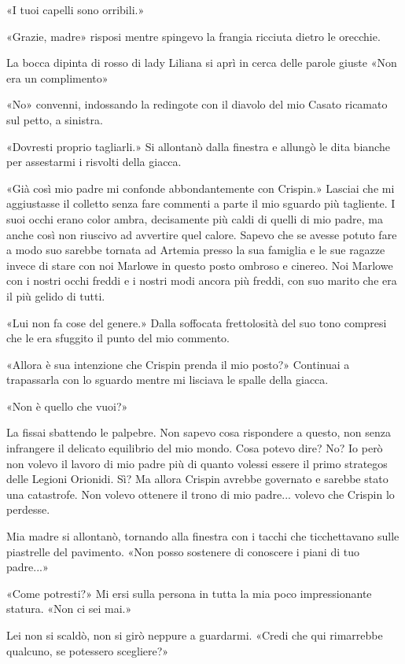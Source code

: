 «I tuoi capelli sono orribili.»

«Grazie, madre» risposi mentre spingevo la frangia ricciuta dietro le
orecchie.

La bocca dipinta di rosso di lady Liliana si aprì in cerca delle parole
giuste «Non era un complimento»

«No» convenni, indossando la redingote con il diavolo del mio Casato
ricamato sul petto, a sinistra.

«Dovresti proprio tagliarli.» Si allontanò dalla finestra e allungò le
dita bianche per assestarmi i risvolti della giacca.

«Già così mio padre mi confonde abbondantemente con Crispin.» Lasciai
che mi aggiustasse il colletto senza fare commenti a parte il mio
sguardo più tagliente. I suoi occhi erano color ambra, decisamente più
caldi di quelli di mio padre, ma anche così non riuscivo ad avvertire
quel calore. Sapevo che se avesse potuto fare a modo suo sarebbe tornata
ad Artemia presso la sua famiglia e le sue ragazze invece di stare con
noi Marlowe in questo posto ombroso e cinereo. Noi Marlowe con i nostri
occhi freddi e i nostri modi ancora più freddi, con suo marito che era
il più gelido di tutti.

«Lui non fa cose del genere.» Dalla soffocata frettolosità del suo tono
compresi che le era sfuggito il punto del mio commento.

«Allora è sua intenzione che Crispin prenda il mio posto?» Continuai a
trapassarla con lo sguardo mentre mi lisciava le spalle della giacca.

«Non è quello che vuoi?»

La fissai sbattendo le palpebre. Non sapevo cosa rispondere a questo,
non senza infrangere il delicato equilibrio del mio mondo. Cosa potevo
dire? No? Io però non volevo il lavoro di mio padre più di quanto
volessi essere il primo strategos delle Legioni Orionidi. Sì? Ma allora
Crispin avrebbe governato e sarebbe stato una catastrofe. Non volevo
ottenere il trono di mio padre... volevo che Crispin lo perdesse.

Mia madre si allontanò, tornando alla finestra con i tacchi che
ticchettavano sulle piastrelle del pavimento. «Non posso sostenere di
conoscere i piani di tuo padre...»

«Come potresti?» Mi ersi sulla persona in tutta la mia poco
impressionante statura. «Non ci sei mai.»

Lei non si scaldò, non si girò neppure a guardarmi. «Credi che qui
rimarrebbe qualcuno, se potessero scegliere?»

